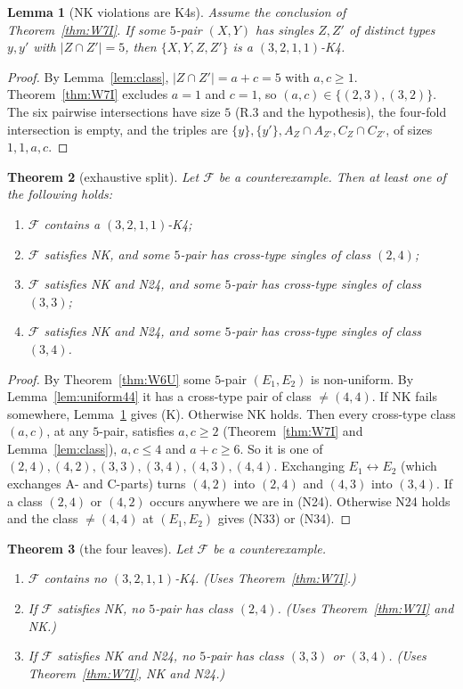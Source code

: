 \documentclass[11pt]{amsart}
\newtheorem{theorem}{Theorem}[section]
\newtheorem{lemma}[theorem]{Lemma}
\theoremstyle{definition}
\newcommand{\cF}{\mathcal{F}}
\begin{document}
\begin{lemma}[NK violations are K4s]\label{lem:NKviol}
Assume the conclusion of Theorem~\ref{thm:W7I}. If some $5$-pair $(X,Y)$ has singles $Z,Z'$ of distinct types $y,y'$ with $|Z\cap Z'|=5$, then $\{X,Y,Z,Z'\}$ is a $(3,2,1,1)$-K4.
\end{lemma}
\begin{proof}
By Lemma~\ref{lem:class}, $|Z\cap Z'|=a+c=5$ with $a,c\ge 1$. Theorem~\ref{thm:W7I} excludes $a=1$ and $c=1$, so $(a,c)\in\{(2,3),(3,2)\}$. The six pairwise intersections have size $5$ (R.3 and the hypothesis), the four-fold intersection is empty, and the triples are $\{y\},\{y'\},A_Z\cap A_{Z'},C_Z\cap C_{Z'}$, of sizes $1,1,a,c$.
\end{proof}

\begin{theorem}[exhaustive split]\label{thm:split}
Let $\cF$ be a counterexample. Then at least one of the following holds:
\begin{enumerate}
\item[\textup{(K)}] $\cF$ contains a $(3,2,1,1)$-K4;
\item[\textup{(N24)}] $\cF$ satisfies NK, and some $5$-pair has cross-type singles of class $(2,4)$;
\item[\textup{(N33)}] $\cF$ satisfies NK and N24, and some $5$-pair has cross-type singles of class $(3,3)$;
\item[\textup{(N34)}] $\cF$ satisfies NK and N24, and some $5$-pair has cross-type singles of class $(3,4)$.
\end{enumerate}
\end{theorem}
\begin{proof}
By Theorem~\ref{thm:W6U} some $5$-pair $(E_1,E_2)$ is non-uniform. By Lemma~\ref{lem:uniform44} it has a cross-type pair of class $\neq(4,4)$. If NK fails somewhere, Lemma~\ref{lem:NKviol} gives (K). Otherwise NK holds. Then every cross-type class $(a,c)$, at any $5$-pair, satisfies $a,c\ge2$ (Theorem~\ref{thm:W7I} and Lemma~\ref{lem:class}), $a,c\le4$ and $a+c\ge6$. So it is one of $(2,4),(4,2),(3,3),(3,4),(4,3),(4,4)$. Exchanging $E_1\leftrightarrow E_2$ (which exchanges A- and C-parts) turns $(4,2)$ into $(2,4)$ and $(4,3)$ into $(3,4)$. If a class $(2,4)$ or $(4,2)$ occurs anywhere we are in (N24). Otherwise N24 holds and the class $\ne(4,4)$ at $(E_1,E_2)$ gives (N33) or (N34).
\end{proof}

\begin{theorem}[the four leaves]\label{thm:leaves}
Let $\cF$ be a counterexample.
\begin{enumerate}
\item[\textup{(K)}] $\cF$ contains no $(3,2,1,1)$-K4. (Uses Theorem~\ref{thm:W7I}.)
\item[\textup{(N24)}] If $\cF$ satisfies NK, no $5$-pair has class $(2,4)$. (Uses Theorem~\ref{thm:W7I} and NK.)
\item[\textup{(N33),(N34)}] If $\cF$ satisfies NK and N24, no $5$-pair has class $(3,3)$ or $(3,4)$. (Uses Theorem~\ref{thm:W7I}, NK and N24.)
\end{enumerate}
\end{theorem}
\end{document}
